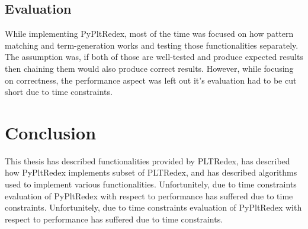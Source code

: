 \subsection{Evaluation}
While implementing PyPltRedex, most of the time was focused on how pattern matching and term-generation works and testing those functionalities separately. The assumption was, if both of those are well-tested and produce expected results then chaining them would also produce correct results. However, while focusing on correctness, the performance aspect was left out it's evaluation had to be cut short due to time constraints. 

\section{Conclusion}
This thesis has described functionalities provided by PLTRedex, has described how PyPltRedex implements subset of PLTRedex, and has described algorithms used to implement various functionalities. Unfortunitely, due to time constraints evaluation of PyPltRedex with respect to performance has suffered due to time constraints. Unfortunitely, due to time constraints evaluation of PyPltRedex with respect to performance has suffered due to time constraints.
